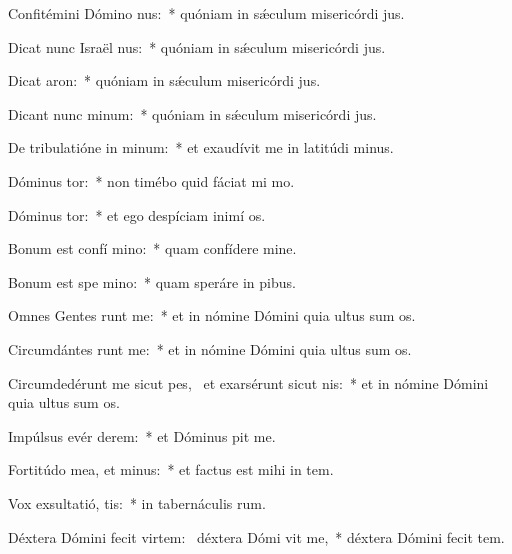 \item Confitémini Dómino  nus:~* quóniam in sǽculum misericórdi jus.
\item Dicat nunc Israël  nus:~* quóniam in sǽculum misericórdi jus.
\item Dicat   aron:~* quóniam in sǽculum misericórdi jus.
\item Dicant nunc   minum:~* quóniam in sǽculum misericórdi jus.
\item De tribulatióne in minum:~* et exaudívit me in latitúdi minus.
\item Dóminus  tor:~* non timébo quid fáciat mi mo.
\item Dóminus  tor:~* et ego despíciam inimí os.
\item Bonum est confí  mino:~* quam confídere  mine.
\item Bonum est spe  mino:~* quam speráre in pibus.
\item Omnes Gentes runt me:~* et in nómine Dómini quia ultus sum  os.
\item Circumdántes runt me:~* et in nómine Dómini quia ultus sum  os.
\item Circumdedérunt me sicut pes,~\pscross{} et exarsérunt sicut   nis:~* et in nómine Dómini quia ultus sum  os.
\item Impúlsus evér   derem:~* et Dóminus pit me.
\item Fortitúdo mea, et   minus:~* et factus est mihi in tem.
\item Vox exsultatió,  tis:~* in tabernáculis rum.
\item Déxtera Dómini fecit virtem:~\pscross{} déxtera Dómi vit me,~* déxtera Dómini fecit tem.
